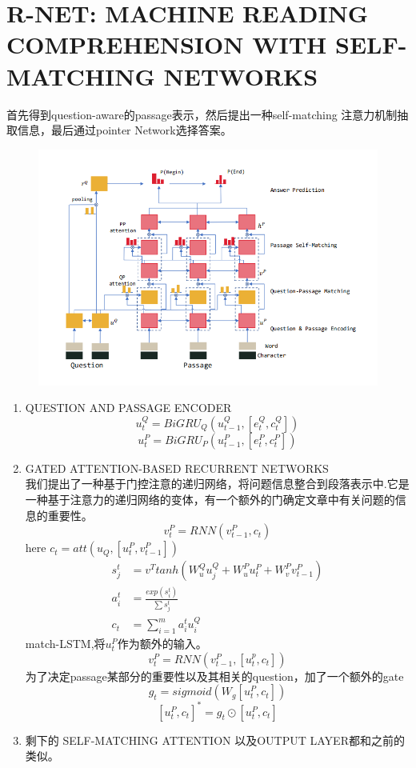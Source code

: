 \documentclass[a4paper,UTF8]{article}
\numberwithin{equation}{section}
\begin{document}
\section{R-NET: MACHINE READING COMPREHENSION WITH SELF-MATCHING NETWORKS}
首先得到question-aware的passage表示，然后提出一种self-matching 注意力机制抽取信息，最后通过pointer Network选择答案。
\begin{figure}[H]
	\centering
	\includegraphics[width=\textwidth]{3-1.png}
\end{figure}
\begin{enumerate}
	\item QUESTION AND PASSAGE ENCODER\\$$u_t^Q=BiGRU_Q(u_{t-1}^Q,[e_t^Q,c_t^Q])$$
	$$u_t^P=BiGRU_P(u_{t-1}^P,[e_t^P,c_t^P])$$
	\item GATED ATTENTION-BASED RECURRENT NETWORKS\\我们提出了一种基于门控注意的递归网络，将问题信息整合到段落表示中.它是一种基于注意力的递归网络的变体，有一个额外的门确定文章中有关问题的信息的重要性。
	$$v_t^P=RNN(v_{t-1}^P,c_t)$$here $c_t=att(u_Q,[u_t^P,v_{t-1}^P])$
	\begin{align*}
		s_j^t&=v^Ttanh(W_u^Qu_j^Q+W_u^Pu_t^P+W_v^Pv_{t-1}^P)\\
		a_i^t&=\frac{exp(s_i^t)}{\sum s_j^t}\\
		c_t&=\sum_{i=1}^m a_i^tu_i^Q 
	\end{align*}
	match-LSTM,将$u_t^P$作为额外的输入。$$v_t^P=RNN(v_{t-1}^P,[u_t^p,c_t])$$
	为了决定passage某部分的重要性以及其相关的question，加了一个额外的gate$$g_t=sigmoid(W_g[u_t^P,c_t])$$
	$$[u_t^P,c_t]^*=g_t \odot [u_t^P,c_t]$$
	\item 剩下的 SELF-MATCHING ATTENTION 以及OUTPUT LAYER都和之前的类似。
\end{enumerate}
\end{document}
